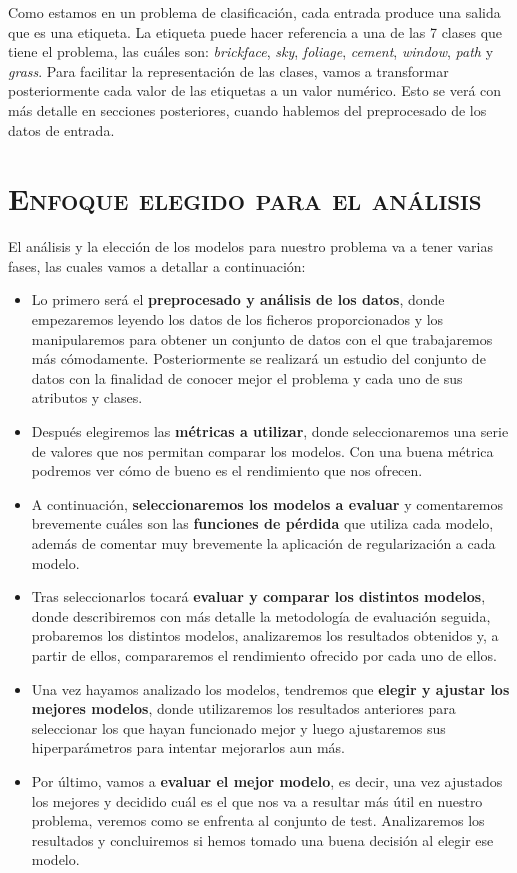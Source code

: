 \documentclass[11pt,a4paper]{article}
\begin{document}
Como estamos en un problema de clasificación, cada entrada produce una salida que es una etiqueta. La etiqueta puede hacer
referencia a una de las 7 clases que tiene el problema, las cuáles son: \textit{brickface}, \textit{sky},
\textit{foliage}, \textit{cement}, \textit{window}, \textit{path} y \textit{grass}. Para facilitar la representación de
las clases, vamos a transformar posteriormente cada valor de las etiquetas a un valor numérico. Esto se verá con más
detalle en secciones posteriores, cuando hablemos del preprocesado de los datos de entrada.

\newpage

\section{\textsc{Enfoque elegido para el análisis}}

El análisis y la elección de los modelos para nuestro problema va a tener varias fases, las cuales vamos a detallar a continuación:
\begin{itemize}[label=\textbullet]
\item Lo primero será el \textbf{preprocesado y análisis de los datos}, donde empezaremos leyendo los datos de los ficheros
proporcionados y los manipularemos para obtener un conjunto de datos con el que trabajaremos más cómodamente. Posteriormente se realizará
un estudio del conjunto de datos con la finalidad de conocer mejor el problema y cada uno de sus atributos y clases.
\item Después elegiremos las \textbf{métricas a utilizar}, donde seleccionaremos una serie de valores que nos permitan comparar los modelos.
Con una buena métrica podremos ver cómo de bueno es el rendimiento que nos ofrecen.
\item A continuación, \textbf{seleccionaremos los modelos a evaluar } y comentaremos brevemente cuáles son las \textbf{funciones de pérdida}
que utiliza cada modelo, además de comentar muy brevemente la aplicación de regularización a cada modelo.
\item Tras seleccionarlos tocará \textbf{evaluar y comparar los distintos modelos}, donde describiremos con más detalle la metodología
de evaluación seguida, probaremos los distintos modelos, analizaremos los resultados obtenidos y, a partir de ellos, compararemos el
rendimiento ofrecido por cada uno de ellos.
\item Una vez hayamos analizado los modelos, tendremos que \textbf{elegir y ajustar los mejores modelos}, donde utilizaremos los resultados
anteriores para seleccionar los que hayan funcionado mejor y luego ajustaremos sus hiperparámetros para intentar mejorarlos aun más.
\item Por último, vamos a \textbf{evaluar el mejor modelo}, es decir, una vez ajustados los mejores y decidido cuál es el que nos va a resultar
más útil en nuestro problema, veremos como se enfrenta al conjunto de test. Analizaremos los resultados y concluiremos si hemos tomado una
buena decisión al elegir ese modelo.
\end{itemize}
\end{document}
